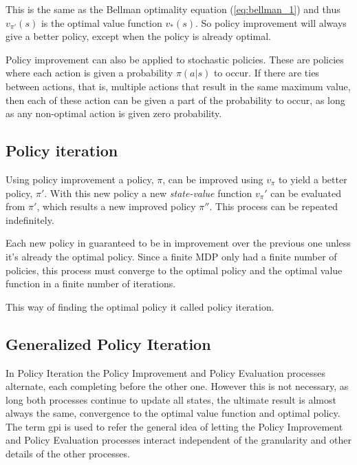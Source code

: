 This is the same as the Bellman optimality equation (\ref{eq:bellman_1}) and thus $v_{\pi'}(s)$ is the optimal value function $v_*(s)$.
So policy improvement will always give a better policy, except when the policy is already optimal.

Policy improvement can also be applied to stochastic policies.
These are policies where each action is given a probability $\pi(a|s)$ to occur.
If there are ties between actions, that is, multiple actions that result in the same maximum value, then each of these action can be given a part of the probability to occur, as long as any non-optimal action is given zero probability.

\subsection{Policy iteration}
Using policy improvement a policy, $\pi$, can be improved using $v_{\pi}$ to yield a better policy, $\pi'$. With this new policy a new \emph{state-value} function $v_\pi'$ can be evaluated from $\pi'$, which results a new improved policy $\pi''$. This process can be repeated indefinitely. 

Each new policy in guaranteed to be in improvement over the previous one unless it's already the optimal policy. Since a finite MDP only had a finite number of policies, this process must converge to the optimal policy and the optimal value function in a finite number of iterations.

This way of finding the optimal policy it called policy iteration.



\subsection{Generalized Policy Iteration}
In Policy Iteration the Policy Improvement and Policy Evaluation processes alternate, each completing before the other one. However this is not necessary, as long both processes continue to update all states, the ultimate result is almost always the same, convergence to the optimal value function and optimal policy. The term \acrfull{gpi} is used to refer the general idea of letting the Policy Improvement and Policy Evaluation processes interact independent of the granularity and other details of the other processes.


